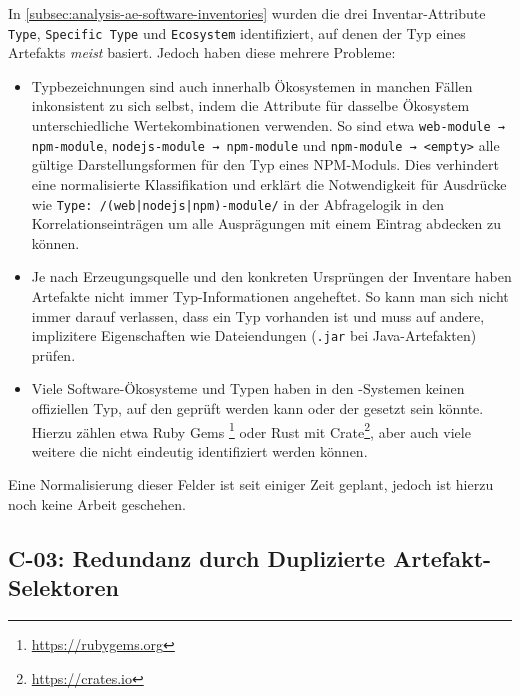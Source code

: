 In \autoref{subsec:analysis-ae-software-inventories} wurden die drei Inventar-Attribute \texttt{Type}, \texttt{Specific Type} und \texttt{Ecosystem} identifiziert, auf denen der Typ eines Artefakts \textit{meist} basiert.
Jedoch haben diese mehrere Probleme:

\begin{itemize}
    \item Typbezeichnungen sind auch innerhalb Ökosystemen in manchen Fällen inkonsistent zu sich selbst, indem die Attribute für dasselbe Ökosystem unterschiedliche Wertekombinationen verwenden.
    So sind etwa \texttt{web-module → npm-module}, \texttt{nodejs-module → npm-module} und \texttt{npm-module → <empty>} alle gültige Darstellungsformen für den Typ eines NPM-Moduls.
    Dies verhindert eine normalisierte Klassifikation und erklärt die Notwendigkeit für Ausdrücke wie \texttt{Type: /(web|nodejs|npm)-module/} in der Abfragelogik in den Korrelationseinträgen um alle Ausprägungen mit einem Eintrag abdecken zu können.

    \item Je nach Erzeugungsquelle und den konkreten Ursprüngen der Inventare haben Artefakte nicht immer Typ-Informationen angeheftet.
    So kann man sich nicht immer darauf verlassen, dass ein Typ vorhanden ist und muss auf andere, implizitere Eigenschaften wie Dateiendungen (\texttt{.jar} bei Java-Artefakten) prüfen.

    \item Viele Software-Ökosysteme und Typen haben in den \metaeffekt-Systemen keinen offiziellen Typ, auf den geprüft werden kann oder der gesetzt sein könnte.
    Hierzu zählen etwa Ruby Gems \footnote{\url{https://rubygems.org}} oder Rust mit Crate\footnote{\url{https://crates.io}}, aber auch viele weitere die nicht eindeutig identifiziert werden können.
\end{itemize}

Eine Normalisierung dieser Felder ist seit einiger Zeit geplant, jedoch ist hierzu noch keine Arbeit geschehen.

\subsection{C-03: Redundanz durch Duplizierte Artefakt-Selektoren}\label{subsec:c-03-duplizierte-artefakt-selektoren}


